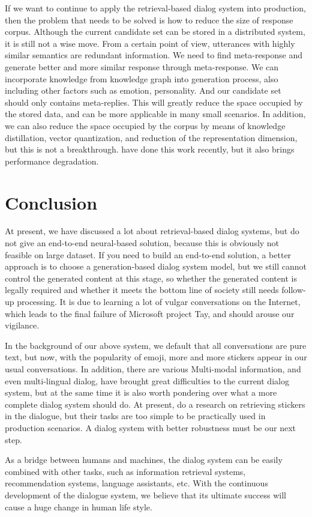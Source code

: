 \documentclass{article}
\begin{document}
If we want to continue to apply the retrieval-based dialog system into production, then the problem that needs to be solved is how to reduce the size of response corpus. Although the current candidate set can be stored in a distributed system, it is still not a wise move. From a certain point of view,  utterances with highly similar semantics are redundant information. We need to find meta-response and generate better and more similar response through meta-response. We can incorporate knowledge from knowledge graph into  generation process, also including other factors such as emotion, personality. And our candidate set should only contains meta-replies. This will greatly reduce the space occupied by the stored data, and can be more applicable in many small scenarios. In addition, we can also reduce the space occupied by the corpus by means of knowledge distillation, vector quantization, and reduction of the representation dimension, but this is not a breakthrough. \cite{lan2020ultra} have done this work recently, but it also brings performance degradation.

\section{Conclusion}

At present, we have discussed a lot about retrieval-based dialog systems, but do not give an end-to-end neural-based solution, because this is obviously not feasible on large dataset. If you need to build an end-to-end solution, a better approach is to choose a generation-based dialog system model, but we still cannot control the generated content at this stage, so whether the generated content is legally required and whether it meets the bottom line of society still needs follow-up processing. It is due to learning a lot of vulgar conversations on the Internet, which leads to the final failure of Microsoft project Tay, and should arouse our vigilance. 

In the background of our above system, we default that all conversations are pure text, but now, with the popularity of emoji, more and more stickers appear in our usual conversations. In addition, there are various Multi-modal information, and even multi-lingual dialog, have brought great difficulties to the current dialog system, but at the same time it is also worth pondering over what a more complete dialog system should do. At present, \cite{gao2020learning} do a research on retrieving stickers in the dialogue, but their tasks are too simple to be practically used in production scenarios. A dialog system with better robustness must be our next step.

As a bridge between humans and machines, the dialog system can be easily combined with other tasks, such as information retrieval systems, recommendation systems, language assistants, etc. With the continuous development of the dialogue system, we believe that its ultimate success will cause a huge change in human life style.


  
\end{document}
